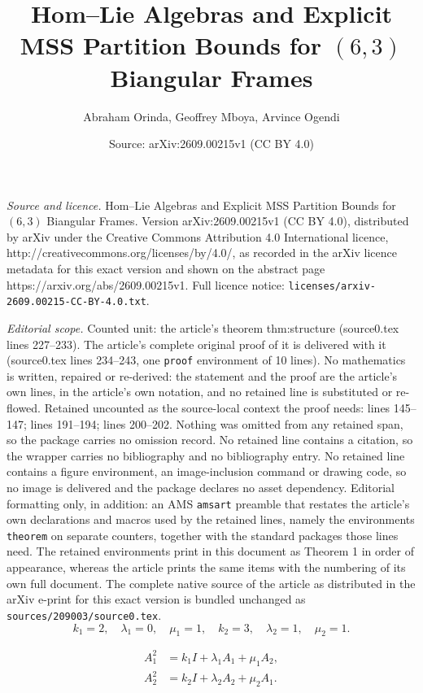 \documentclass[10pt,a4paper]{amsart}
\title{Hom--Lie Algebras and Explicit MSS Partition Bounds for $(6,3)$ Biangular Frames}
\author{Abraham Orinda, Geoffrey Mboya, Arvince Ogendi}
\date{Source: arXiv:2609.00215v1 (CC BY 4.0)}
\begin{document}
\maketitle

\noindent\emph{Source and licence.} Hom--Lie Algebras and Explicit MSS Partition Bounds for $(6,3)$ Biangular Frames. Version arXiv:2609.00215v1 (CC BY 4.0), distributed by arXiv under the Creative Commons Attribution 4.0 International licence, http://creativecommons.org/licenses/by/4.0/, as recorded in the arXiv licence metadata for this exact version and shown on the abstract page https://arxiv.org/abs/2609.00215v1. Full licence notice: \texttt{licenses/arxiv-2609.00215-CC-BY-4.0.txt}.\par\smallskip

\noindent\textit{Editorial scope.} Counted unit: the article's theorem thm:structure (source0.tex lines 227--233). The article's complete original proof of it is delivered with it (source0.tex lines 234--243, one \texttt{proof} environment of 10 lines). No mathematics is written, repaired or re-derived: the statement and the proof are the article's own lines, in the article's own notation, and no retained line is substituted or re-flowed.  Retained uncounted as the source-local context the proof needs: lines 145--147; lines 191--194; lines 200--202.  Nothing was omitted from any retained span, so the package carries no omission record.  No retained line contains a citation, so the wrapper carries no bibliography and no bibliography entry.  No retained line contains a figure environment, an image-inclusion command or drawing code, so no image is delivered and the package declares no asset dependency.  Editorial formatting only, in addition: an AMS \texttt{amsart} preamble that restates the article's own declarations and macros used by the retained lines, namely the environments \texttt{theorem} on separate counters, together with the standard packages those lines need.  The retained environments print in this document as Theorem 1 in order of appearance, whereas the article prints the same items with the numbering of its own full document.  The complete native source of the article as distributed in the arXiv e-print for this exact version is bundled unchanged as \texttt{sources/209003/source0.tex}.
	\begin{equation}
		k_1 = 2,\quad \lambda_1 = 0,\quad \mu_1 = 1,\quad k_2 = 3,\quad \lambda_2 = 1,\quad \mu_2 = 1. \label{eq:srg-params}
	\end{equation}

	\begin{align}
		A_1^2 &= k_1 I + \lambda_1 A_1 + \mu_1 A_2, \label{eq:srg-id1}\\
		A_2^2 &= k_2 I + \lambda_2 A_2 + \mu_2 A_1. \label{eq:srg-id2}
	\end{align}
\end{document}
